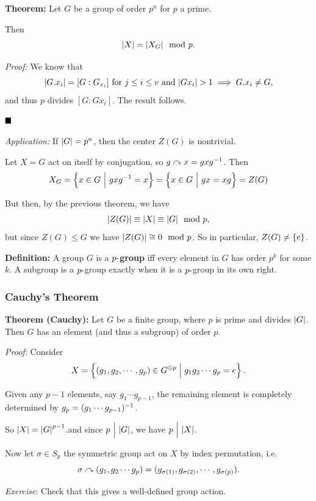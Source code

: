 \textbf{Theorem:} Let \(G\) be a group of order \(p^n\) for \(p\) a
prime.

Then \[
{\left\lvert {X} \right\rvert} = {\left\lvert {X_G} \right\rvert} \mod p
.\]

\emph{Proof:} We know that \[
{\left\lvert {G.x_i} \right\rvert} = [G : G_{x_i}] \text{ for } j \leq i \leq v \text{ and } {\left\lvert {Gx_i} \right\rvert} > 1 \implies G.x_i \neq G
,\] and thus \(p\) divides \([G: G x_i]\). The result follows.

\(\qed\)

\emph{Application:} If \({\left\lvert {G} \right\rvert} = p^n\), then the center \(Z(G)\) is
nontrivial.

Let \(X=G\) act on itself by conjugation, so \(g\curvearrowright x = gxg^{-1}\).
Then \[
X_G = \left\{{x\in G {~\mathrel{\Big|}~} gxg^{-1} = x}\right\} = \left\{{x\in G {~\mathrel{\Big|}~} gx = xg}\right\} = Z(G)
\]

But then, by the previous theorem, we have \[
{\left\lvert {Z(G)} \right\rvert} \equiv {\left\lvert {X} \right\rvert}\equiv {\left\lvert {G} \right\rvert} \mod p
,\] but since \(Z(G) \leq G\) we have \({\left\lvert {Z(G)} \right\rvert} \cong 0 \mod p\). So
in particular, \(Z(G) \neq \left\{{e}\right\}\).

\textbf{Definition:} A group \(G\) is a \textbf{\(p{\hbox{-}}\)group} iff
every element in \(G\) has order \(p^k\) for some \(k\). A subgroup is a
\(p{\hbox{-}}\)group exactly when it is a \(p{\hbox{-}}\)group in its own right.

\hypertarget{cauchys-theorem}{%
\subsubsection{Cauchy's Theorem}\label{cauchys-theorem}}

\textbf{Theorem (Cauchy):} Let \(G\) be a finite group, where \(p\) is
prime and divides \({\left\lvert {G} \right\rvert}\). Then \(G\) has an element (and thus a
subgroup) of order \(p\).

\emph{Proof:} Consider \[
X = \left\{{(g_1, g_2, \cdots , g_p) \in G^{\oplus p} \mathrel{\Big|} g_1g_2\cdots g_p = e}\right\}
.\]

Given any \(p-1\) elements, say \(g_1 \cdots g_{p-1}\), the remaining
element is completely determined by \(g_p = (g_1 \cdots g_{p-1})^{-1}\).

So \({\left\lvert {X} \right\rvert} = {\left\lvert {G} \right\rvert}^{p-1}\).and since \(p {~\Bigm| ~} {\left\lvert {G} \right\rvert}\), we have
\(p {~\Bigm| ~} {\left\lvert {X} \right\rvert}\).

Now let \(\sigma \in S_p\) the symmetric group act on \(X\) by index
permutation, i.e. \[
\sigma \curvearrowright (g_1, g_2 \cdots g_p) = (g_{\sigma(1)}, g_{\sigma(2)}, \cdots, g_{\sigma(p)})
.\]

\emph{Exercise}: Check that this gives a well-defined group action.

